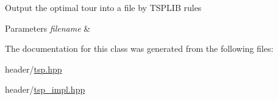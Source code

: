 Output the optimal tour into a file by T\+S\+P\+L\+IB rules 
\begin{DoxyParams}{Parameters}
{\em filename} & \\
\hline
\end{DoxyParams}


The documentation for this class was generated from the following files\+:\begin{DoxyCompactItemize}
\item 
header/\hyperlink{tsp_8hpp}{tsp.\+hpp}\item 
header/\hyperlink{tsp__impl_8hpp}{tsp\+\_\+impl.\+hpp}\end{DoxyCompactItemize}
